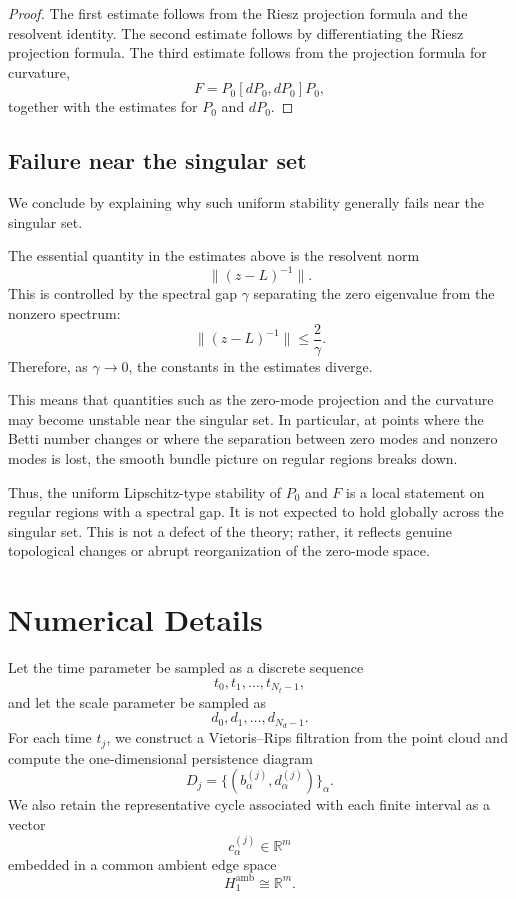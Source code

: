 \documentclass[pdflatex,sn-mathphys-num]{sn-jnl}%
\theoremstyle{thmstyleone}%
\theoremstyle{thmstyletwo}%
\theoremstyle{thmstylethree}%
\begin{document}
\begin{appendices}
\begin{proof}
The first estimate follows from the Riesz projection formula and the resolvent identity. The second estimate follows by differentiating the Riesz projection formula. The third estimate follows from the projection formula for curvature,
\[
F=P_0[dP_0,dP_0]P_0,
\]
together with the estimates for \(P_0\) and \(dP_0\).
\end{proof}

\subsection{Failure near the singular set}

We conclude by explaining why such uniform stability generally fails near the singular set.

The essential quantity in the estimates above is the resolvent norm
\[
\|(z-L)^{-1}\|.
\]
This is controlled by the spectral gap \(\gamma\) separating the zero eigenvalue from the nonzero spectrum:
\[
\|(z-L)^{-1}\|\le \frac{2}{\gamma}.
\]
Therefore, as \(\gamma\to0\), the constants in the estimates diverge.

This means that quantities such as the zero-mode projection and the curvature may become unstable near the singular set. In particular, at points where the Betti number changes or where the separation between zero modes and nonzero modes is lost, the smooth bundle picture on regular regions breaks down.

Thus, the uniform Lipschitz-type stability of \(P_0\) and \(F\) is a local statement on regular regions with a spectral gap. It is not expected to hold globally across the singular set. This is not a defect of the theory; rather, it reflects genuine topological changes or abrupt reorganization of the zero-mode space.




\section{Numerical Details}

Let the time parameter be sampled as a discrete sequence
\[
t_0,t_1,\dots,t_{N_t-1},
\]
and let the scale parameter be sampled as
\[
d_0,d_1,\dots,d_{N_d-1}.
\]
For each time \(t_j\), we construct a Vietoris--Rips filtration from the point cloud and compute the one-dimensional persistence diagram
\[
D_j=\{(b_\alpha^{(j)},d_\alpha^{(j)})\}_\alpha.
\]
We also retain the representative cycle associated with each finite interval as a vector
\[
c_\alpha^{(j)}\in \mathbb{R}^m
\]
embedded in a common ambient edge space
\[
H_1^{\mathrm{amb}}\cong \mathbb{R}^m.
\]


\end{appendices}
\end{document}
